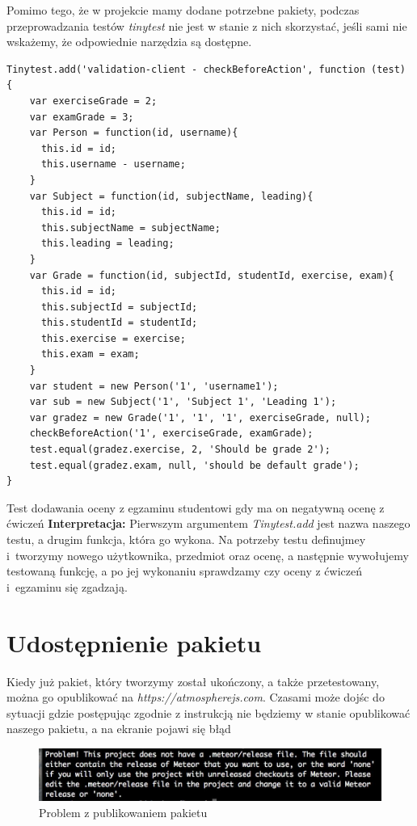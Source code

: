 \documentclass[openright]{xmgr}
\begin{document}
Pomimo tego, że w projekcie mamy dodane potrzebne pakiety, podczas przeprowadzania testów \textit{tinytest} nie jest w stanie z nich skorzystać, jeśli sami nie wskażemy, że odpowiednie narzędzia są dostępne.

\begin{listing}[H]
\begin{verbatim}
Tinytest.add('validation-client - checkBeforeAction', function (test) {
    var exerciseGrade = 2;
    var examGrade = 3;
    var Person = function(id, username){
      this.id = id;
      this.username - username;
    }
    var Subject = function(id, subjectName, leading){
      this.id = id;
      this.subjectName = subjectName;
      this.leading = leading;
    }
    var Grade = function(id, subjectId, studentId, exercise, exam){
      this.id = id;
      this.subjectId = subjectId;
      this.studentId = studentId;
      this.exercise = exercise;
      this.exam = exam;
    }
    var student = new Person('1', 'username1');
    var sub = new Subject('1', 'Subject 1', 'Leading 1');
    var gradez = new Grade('1', '1', '1', exerciseGrade, null);
    checkBeforeAction('1', exerciseGrade, examGrade);
    test.equal(gradez.exercise, 2, 'Should be grade 2');
    test.equal(gradez.exam, null, 'should be default grade');
}
\end{verbatim}
\caption{Test dodawania oceny z egzaminu studentowi gdy ma on negatywną ocenę z ćwiczeń \newline \newline \hspace{\linewidth} \textbf{Interpretacja:} Pierwszym argumentem \textit{Tinytest.add} jest nazwa naszego testu, a drugim  funkcja, która go wykona. Na potrzeby testu definujmey i~tworzymy nowego użytkownika, przedmiot oraz ocenę, a następnie wywołujemy testowaną funkcję, a po jej wykonaniu sprawdzamy czy oceny z ćwiczeń i~egzaminu się zgadzają.\cite{TinyTest}  \newline}
\end{listing}

\section{Udostępnienie pakietu}

\indent \indent \indent Kiedy już pakiet, który tworzymy został ukończony, a także przetestowany, można go opublikować na \textit{https://atmospherejs.com}.\cite{atmospherejs} Czasami może dojśc do sytuacji gdzie postępując zgodnie z instrukcją nie będziemy w stanie opublikować naszego pakietu, a na ekranie pojawi się błąd
\begin{figure}[H]
\centering
\includegraphics[width=0.7\hsize]{images/publishProblem}
\caption{Problem z publikowaniem pakietu\label{RYS.22}}
\end{figure}
\end{document}
